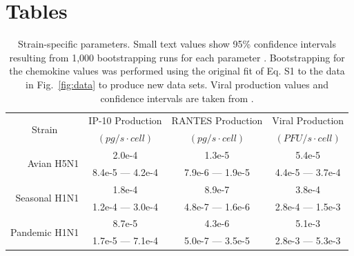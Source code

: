 \documentclass[preprint,10pt,authoryear]{elsarticle}
\begin{document}
%

\pagebreak

\section*{Tables}



\begin{table}[!ht]
\centering
\begin{tabular}{ | r | c | c | c | }
  \hline                        
  \multicolumn{1}{|c|}{\multirow{2}{*}{Strain}} & IP-10 Production & RANTES Production & Viral Production \\
   & \footnotesize{$(pg/s\cdot cell)$}  & \footnotesize{$(pg/s\cdot cell)$} &  \footnotesize{$(PFU/s\cdot cell)$} \\
  \hline
  \multirow{2}{*}{Avian H5N1} & 2.0e-4 &  1.3e-5 & 5.4e-5 \\
   &  \footnotesize{8.4e-5 --- 4.2e-4} & \footnotesize{7.9e-6 --- 1.9e-5} & \footnotesize{4.4e-5 --- 3.7e-4}\\ 
   \hline
  \multirow{2}{*}{Seasonal H1N1} & 1.8e-4 &  8.9e-7 & 3.8e-4 \\
   & \footnotesize{1.2e-4 --- 3.0e-4} & \footnotesize{4.8e-7 --- 1.6e-6} & \footnotesize{2.8e-4 --- 1.5e-3}\\
   \hline
  \multirow{2}{*}{Pandemic H1N1} & 8.7e-5 &  4.3e-6 & 5.1e-3 \\
   & \footnotesize{1.7e-5 --- 7.1e-4} & \footnotesize{5.0e-7 --- 3.5e-5} & \footnotesize{2.8e-3 --- 5.3e-3} \\
  \hline
\end{tabular}
\caption{Strain-specific parameters.  Small text values show 95\% confidence intervals resulting from 1,000 bootstrapping runs for each parameter \citep{Wu1986}.  Bootstrapping for the chemokine values was performed using the original fit of Eq. S1 to the data in Fig.~\ref{fig:data} to produce new data sets.  Viral production values and confidence intervals are taken from \citep{Mitchell2011}.}
\label{tab:strains}
\end{table}
\end{document}
